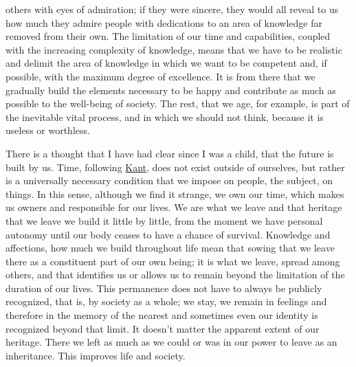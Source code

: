 \documentclass[]{book}
\begin{document}
others with eyes of admiration; if they were sincere, they would all reveal to us how much they admire people with dedications to an area of knowledge far removed from their own. The limitation of our time and capabilities, coupled with the increasing complexity of knowledge, means that we have to be realistic and delimit the area of knowledge in which we want to be competent and, if possible, with the maximum degree of excellence. It is from there that we gradually build the elements necessary to be happy and contribute as much as possible to the well-being of society. The rest, that we age, for example, is part of the inevitable vital process, and in which we should not think, because it is useless or worthless.

There is a thought that I have had clear since I was a child, that the future is built by us. Time, following \href{https://en.wikipedia.org/wiki/Immanuel_Kant}{Kant}, does not exist outside of ourselves, but rather is a universally necessary condition that we impose on people, the subject, on things. In this sense, although we find it strange, we own our time, which makes us owners and responsible for our lives. We are what we leave and that heritage that we leave we build it little by little, from the moment we have personal autonomy until our body ceases to have a chance of survival. Knowledge and affections, how much we build throughout life mean that sowing that we leave there as a constituent part of our own being; it is what we leave, spread among others, and that identifies us or allows us to remain beyond the limitation of the duration of our lives. This permanence does not have to always be publicly recognized, that is, by society as a whole; we stay, we remain in feelings and therefore in the memory of the nearest and sometimes even our identity is recognized beyond that limit. It doesn't matter the apparent extent of our heritage. There we left as much as we could or was in our power to leave as an inheritance. This improves life and society.
\end{document}

